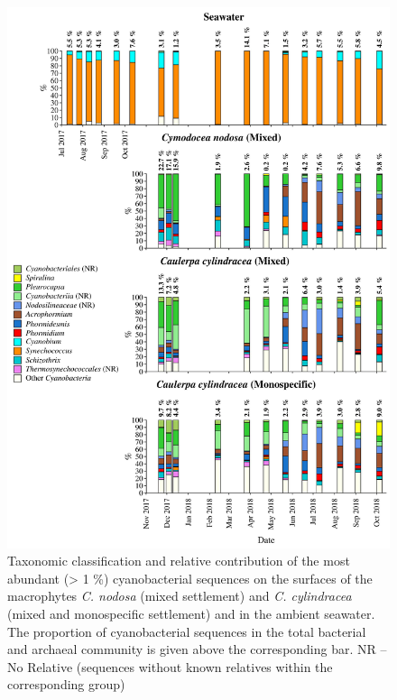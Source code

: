 \documentclass[12pt,]{article}
\begin{document}
\begin{figure}[H]

{\centering \includegraphics[width=0.85\linewidth]{../results/figures/cyanobacteria_bar_plot} 

}

\caption{Taxonomic classification and relative contribution of the most abundant (> 1 \si{\percent}) cyanobacterial sequences on the surfaces of the macrophytes \textit{C. nodosa} (mixed settlement) and \textit{C. cylindracea} (mixed and monospecific settlement) and in the ambient seawater. The proportion of cyanobacterial sequences in the total bacterial and archaeal community is given above the corresponding bar. NR -- No Relative (sequences without known relatives within the corresponding group)\label{cyano}}\label{fig:unnamed-chunk-5}
\end{figure}
\end{document}
